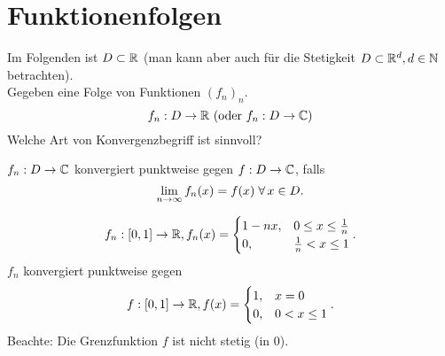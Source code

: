 \documentclass[../ana1.tex]{subfiles}
\begin{document}
\setcounter{section}{19}
\section{Funktionenfolgen}

Im Folgenden ist \( D \subset \mathbb{R} \) (man kann aber auch 
für die Stetigkeit \( D \subset \mathbb{R}^d, d \in \mathbb{N} \) betrachten). \\
Gegeben eine Folge von Funktionen \( {(f_n)}_n \).
\[ f_n: D \rightarrow \mathbb{R} \ (\text{oder } f_n: D \rightarrow \mathbb{C}) \]
Welche Art von Konvergenzbegriff ist sinnvoll?
\begin{defi}
    \( f_n : D \rightarrow \mathbb{C} \) konvergiert punktweise 
    gegen \( f: D \rightarrow \mathbb{C} \), falls 
    \[ \lim\limits_{n\rightarrow\infty} f_n(x) = f(x) \; \forall \, x \in D. \]
\end{defi}
\begin{bsp}
    \[ f_n: [0,1] \rightarrow \mathbb{R}, f_n(x) = \begin{cases}
        1 - nx, &0 \leq x \leq \frac{1}{n} \\
        0, &\frac{1}{n} < x \leq 1
    \end{cases}. \]
    \( f_n \) konvergiert punktweise gegen 
    \[ f: [0,1] \rightarrow \mathbb{R}, f(x) = 
    \begin{cases}
        1, &x = 0 \\
        0, &0 < x \leq 1
    \end{cases}. \]
    Beachte: Die Grenzfunktion \(f\) ist nicht stetig 
    (in \(0\)).
\end{bsp}
\end{document}
